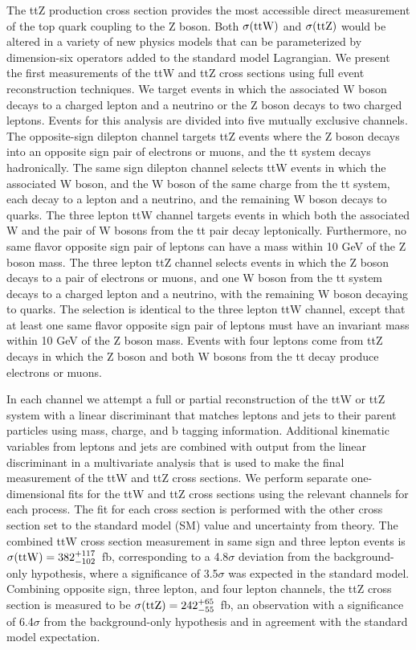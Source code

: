 \documentclass[a4paper]{PoS}
\begin{document}
The ttZ production cross section provides the most accessible direct measurement
of the top quark coupling to the Z boson. Both $\sigma({\rm ttW})$ and
$\sigma({\rm ttZ})$ would be altered in a variety of new physics models that can
be parameterized by dimension-six operators added to the standard model Lagrangian.
We present~\cite{TOP-14-021} the first measurements of the ttW and ttZ cross
sections using full event reconstruction techniques. We target events in which the
associated W boson decays to a charged lepton and a neutrino or the Z boson decays
to two charged leptons.
Events for this analysis are divided into five mutually exclusive channels.
The opposite-sign dilepton channel targets ttZ events
where the Z boson decays into an opposite sign pair of electrons or muons, and the tt system
decays hadronically.
The same sign dilepton channel selects ttW events in which the associated W boson, and the
W boson of the same charge from the tt system, each decay to a lepton and a neutrino, and
the remaining W boson decays to quarks.
The three lepton ttW channel targets events in which both the associated W and the pair of W
bosons from the tt pair decay leptonically. Furthermore, no same flavor opposite sign pair
of leptons can have a mass within 10 GeV of the Z boson mass.
The three lepton ttZ channel selects events in which the Z boson decays to a pair of electrons
or muons,  and one W boson from the tt system decays to a charged lepton and a neutrino,
with the remaining W boson decaying to quarks.  The selection is identical to the three lepton
ttW channel, except that at least one same flavor opposite sign pair of leptons must have an
invariant mass within 10 GeV of the Z boson mass.
Events with four leptons come from ttZ decays in which the Z boson and both W bosons from
the tt decay produce electrons or muons.

In each channel we attempt a full or partial reconstruction of the ttW or ttZ system with a linear
discriminant that matches leptons and jets to their parent particles using mass, charge, and b
tagging information. Additional kinematic variables from leptons and jets are combined with output
from the linear discriminant in a multivariate analysis that is used to make the final measurement
of the ttW and ttZ cross sections.
We perform separate one-dimensional fits for the ttW and ttZ cross sections using the relevant
channels for each process. The fit for each cross section is performed with the other cross section
set to the standard model (SM) value and uncertainty from theory.
The combined ttW cross section measurement in same sign and three lepton events is
$\sigma({\rm ttW}) = 382^{+117}_{-102}$~fb, corresponding to a 4.8$\sigma$ deviation from
the background-only hypothesis, where a significance of 3.5$\sigma$ was expected in
the standard model. Combining opposite sign, three lepton, and four lepton channels, the
ttZ cross section is measured to be
$\sigma({\rm ttZ}) = 242^{+65}_{-55}$~fb, an observation with a significance of 6.4$\sigma$
from the background-only hypothesis and in agreement with the standard model expectation.
\end{document}
